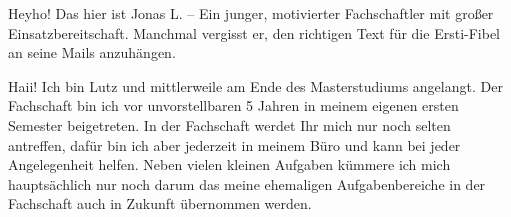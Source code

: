\begin{multicols*}{2}
{Heyho! Das hier ist Jonas L. -- Ein junger, motivierter Fachschaftler mit großer Einsatzbereitschaft. Manchmal vergisst er, den richtigen Text für die Ersti-Fibel an seine Mails anzuhängen.
\vspace{3\baselineskip}}

{Haii! Ich bin Lutz und mittlerweile am Ende des Masterstudiums angelangt. Der Fachschaft bin ich vor unvorstellbaren 5 Jahren in meinem eigenen ersten Semester beigetreten. In der Fachschaft werdet Ihr mich nur noch selten antreffen, dafür bin ich aber jederzeit in meinem Büro und kann bei jeder Angelegenheit helfen. Neben vielen kleinen Aufgaben kümmere ich mich hauptsächlich nur noch darum das meine ehemaligen Aufgabenbereiche in der Fachschaft auch in Zukunft übernommen werden.

}
\end{multicols*}
